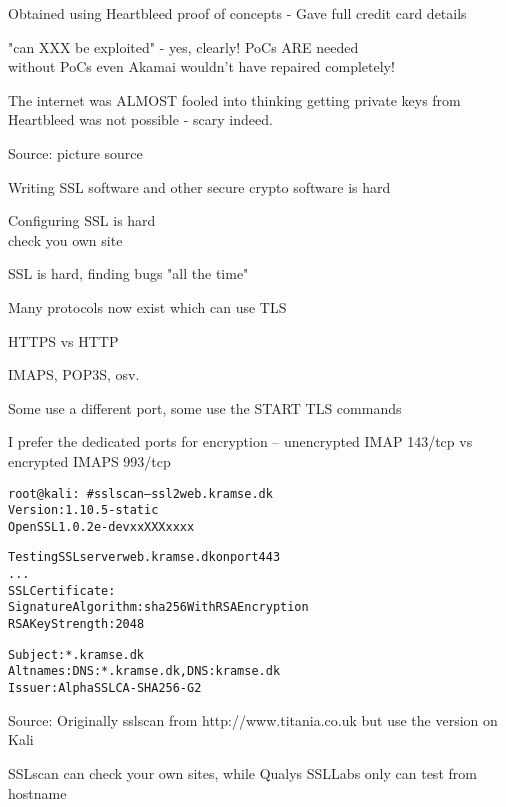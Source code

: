 \documentclass[Screen16to9,17pt]{foils}
\begin{document}
\begin{list2}
\item Obtained using Heartbleed proof of concepts - Gave full credit card details
\item "can XXX be exploited" - yes, clearly! PoCs ARE needed\\
without PoCs even Akamai wouldn't have repaired completely!
\item The internet was ALMOST fooled into thinking getting private keys from Heartbleed was not possible - scary indeed.
\end{list2}


Source: picture source\\ {\footnotesize{}}
\begin{list2}
\item Writing SSL software and other secure crypto software is hard
\item Configuring SSL is hard\\
check you own site 
\item SSL is hard, finding bugs "all the time"
\end{list2}





\begin{list1}
\item Many protocols now exist which can use TLS
\item HTTPS vs HTTP
\item IMAPS, POP3S, osv.
\item Some use a different port, some use the START TLS commands
\item I prefer the dedicated ports for encryption -- unencrypted IMAP 143/tcp vs encrypted IMAPS 993/tcp
\end{list1}




\begin{alltt}\small
root@kali:~# sslscan --ssl2 web.kramse.dk
Version: 1.10.5-static
OpenSSL 1.0.2e-dev xx XXX xxxx

Testing SSL server web.kramse.dk on port 443
...
  SSL Certificate:
Signature Algorithm: sha256WithRSAEncryption
RSA Key Strength:    2048

Subject:  *.kramse.dk
Altnames: DNS:*.kramse.dk, DNS:kramse.dk
Issuer:   AlphaSSL CA - SHA256 - G2
\end{alltt}

Source:
Originally sslscan from http://www.titania.co.uk
 but use the version on Kali

SSLscan can check your own sites, while Qualys SSLLabs only can test from hostname





\slidenext{}
\end{document}
